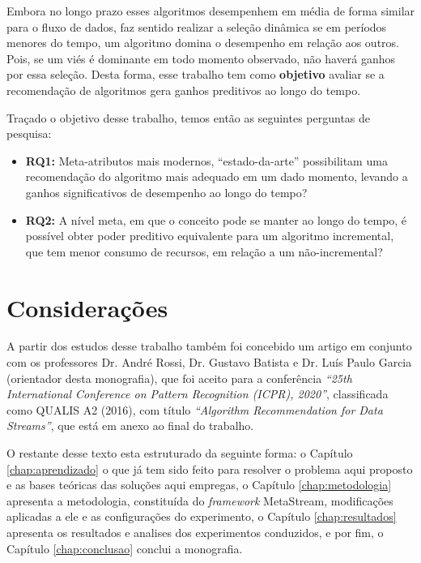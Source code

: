 Embora no longo prazo esses algoritmos desempenhem em média de forma similar para o fluxo de dados, faz sentido realizar a seleção dinâmica se em períodos menores do tempo, um algoritmo domina o desempenho em relação aos outros. Pois, se um viés é dominante em todo momento observado, não haverá ganhos por essa seleção. Desta forma, esse trabalho tem como \textbf{objetivo} avaliar se a recomendação de algoritmos gera ganhos preditivos ao longo do tempo.

Traçado o objetivo desse trabalho, temos então as seguintes perguntas de pesquisa:
\begin{itemize}
    \item \textbf{RQ1:} Meta-atributos mais modernos, ``estado-da-arte'' possibilitam uma recomendação do algoritmo mais adequado em um dado momento, levando a ganhos significativos de desempenho ao longo do tempo?
    \item \textbf{RQ2:} A nível meta, em que o conceito pode se manter ao longo do tempo, é possível obter poder preditivo equivalente para um algoritmo incremental, que tem menor consumo de recursos, em relação a um não-incremental?
\end{itemize}

\section{Considerações}

A partir dos estudos desse trabalho também foi concebido um artigo em conjunto com os professores Dr. André Rossi, Dr. Gustavo Batista e Dr. Luís Paulo Garcia (orientador desta monografia), que foi aceito para a conferência \textit{``25th International Conference on Pattern Recognition (ICPR), 2020''}, classificada como QUALIS A2 (2016), com título \textit{``Algorithm Recommendation for Data Streams''}, que está em anexo ao final do trabalho. 

O restante desse texto esta estruturado da seguinte forma: o Capítulo \ref{chap:aprendizado} o que já tem sido feito para resolver o problema aqui proposto e as bases teóricas das soluções aqui empregas, o Capítulo \ref{chap:metodologia} apresenta a metodologia, constituída do \textit{framework} MetaStream, modificações aplicadas a ele e as configurações do experimento, o Capítulo \ref{chap:resultados} apresenta os resultados e analises dos experimentos conduzidos, e por fim, o Capítulo \ref{chap:conclusao} conclui a monografia.